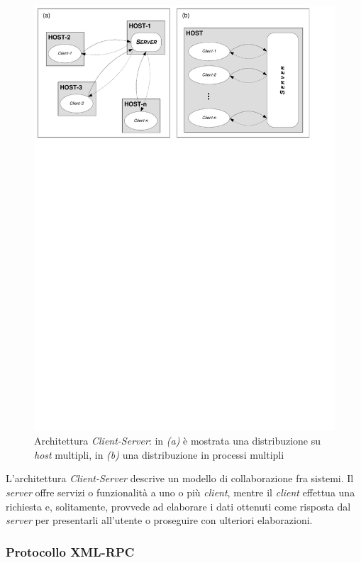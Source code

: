 \begin{figure}[h]
\centering
\includegraphics[scale=0.7, viewport=6 582 546 838]{Immagini/Capitolo2/Client-Server.pdf}
\caption[Architettura \emph{Client-Server}]{Architettura \emph{Client-Server}: in \emph{(a)} è mostrata una distribuzione su \emph{host} multipli, in \emph{(b)} una distribuzione in processi multipli}\label{fig:client-server}
\end{figure}

L'architettura \emph{Client-Server} descrive un modello di collaborazione fra sistemi. Il \emph{server} offre servizi o funzionalità a uno o più \emph{client}, mentre il \emph{client} effettua una richiesta e, solitamente, provvede ad elaborare i dati ottenuti come risposta dal \emph{server} per presentarli all'utente o proseguire con ulteriori elaborazioni.

\subsubsection{Protocollo XML-RPC}\label{par:xmlrpc}

